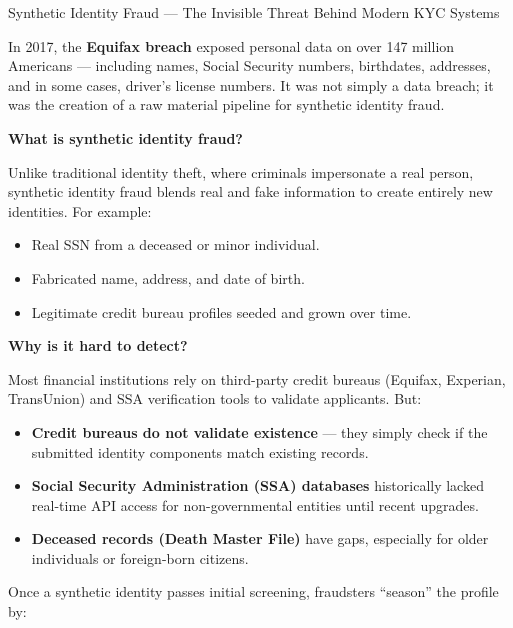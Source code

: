 \begin{HistoricalSidebar}{Synthetic Identity Fraud --- The Invisible Threat Behind Modern KYC Systems}

    In 2017, the \textbf{Equifax breach} exposed personal data on over 147 million Americans — including names, Social Security numbers, birthdates, addresses, and in some cases, driver’s license numbers. It was not simply a data breach; it was the creation of a raw material pipeline for synthetic identity fraud.
    
    \medskip
    
    \textbf{What is synthetic identity fraud?}
    
    Unlike traditional identity theft, where criminals impersonate a real person, synthetic identity fraud blends real and fake information to create entirely new identities. For example:
    
    \begin{itemize}
      \item Real SSN from a deceased or minor individual.
      \item Fabricated name, address, and date of birth.
      \item Legitimate credit bureau profiles seeded and grown over time.
    \end{itemize}
    
    \medskip
    
    \textbf{Why is it hard to detect?}
    
    Most financial institutions rely on third-party credit bureaus (Equifax, Experian, TransUnion) and SSA verification tools to validate applicants. But:
    
    \begin{itemize}
      \item \textbf{Credit bureaus do not validate existence} — they simply check if the submitted identity components match existing records.
      \item \textbf{Social Security Administration (SSA) databases} historically lacked real-time API access for non-governmental entities until recent upgrades.
      \item \textbf{Deceased records (Death Master File)} have gaps, especially for older individuals or foreign-born citizens.
    \end{itemize}
    
    \medskip
    
    Once a synthetic identity passes initial screening, fraudsters ``season'' the profile by:
    

\end{HistoricalSidebar}
